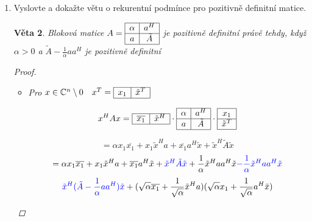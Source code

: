 \documentclass[10pt,a4paper]{article}
\theoremstyle{plain}
\newtheorem{veta}{Věta}
\begin{document}
\begin{enumerate}
\begin{veta}
\begin{proof}
\begin{itemize}
$U$ je regulární, protože diagonální i unitární matice jsou regulární.
\item[$3 \implies 1$]
Pokud $x \in \mathbb{C}^n \setminus 0$, pak $Ux \neq 0$, protože $U$ je regulární.

$x^HAx = x^HU^H Ux = (Ux)^H Ux = \langle Ux | Ux \rangle > 0 $

\end{itemize}\end{proof}
\end{veta}

\item Vyslovte a dokažte větu o rekurentní podmínce pro pozitivně definitní matice.

\begin{veta}
Bloková matice $A = \begin{array}{|c|c|} \hline  \alpha & a^H  \\ \hline  a & \tilde{A} \\ \hline \end{array}$ je pozitivně definitní právě tehdy, když $\alpha > 0$ a $\tilde{A} - \frac1\alpha a a^H$ je pozitivně definitní
\begin{proof} $\ $
\begin{itemize}
\item[$\impliedby$]
Pro $x \in \mathbb{C}^n \setminus 0 \quad x^T = \begin{array}{|c|c|} \hline x_1 & \tilde{x}^T \\ \hline \end{array}$


\[ x^HAx = \begin{array}{|c|c|} \hline \overline{x_1} & \tilde{x}^H \\ \hline \end{array} \cdot \begin{array}{|c|c|} \hline  \alpha & a^H  \\ \hline  a & \tilde{A} \\ \hline \end{array} \cdot \begin{array}{|c|} \hline x_1  \\ \hline \tilde{x}^T \\ \hline \end{array} \]

\[ = \alpha x_1 \overline{x_1} + x_1 \tilde{x}^H a + \overline{x_1}a^H \tilde{x} + \tilde{x}^H \tilde{A} \tilde{x} \]
\[ = \alpha x_1 \overline{x_1} + x_1 \tilde{x}^H a + \overline{x_1}a^H \tilde{x} +{ \color{blue} \tilde{x}^H \tilde{A} \tilde{x} } +  \frac1\alpha\tilde{x}^Haa^H\tilde{x} { \color{blue} - \frac1\alpha\tilde{x}^Haa^H\tilde{x} } \]\[
{ \color{blue} \tilde{x}^H (\tilde{A} - \frac{1}{\alpha} aa^H)\tilde{x} } + (\sqrt{\alpha}\overline{x_1} + \frac1{\sqrt{\alpha}}\tilde{x}^H a)(\sqrt{\alpha}x_1 + \frac1{\sqrt{\alpha}}a^H\tilde{x} ) \]


\end{itemize}
\end{proof}
\end{veta}
\end{enumerate}
\end{document}
